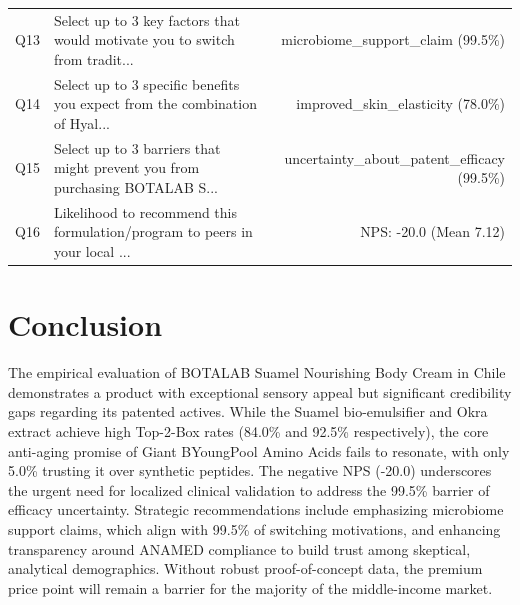 \documentclass[10pt,twocolumn,a4paper]{article}
\begin{document}
\begin{table}[t]
\begin{tabularx}{\textwidth}{l X r}
Q13 & Select up to 3 key factors that would motivate you to switch from tradit... & microbiome\_support\_claim (99.5\%) \\
Q14 & Select up to 3 specific benefits you expect from the combination of Hyal... & improved\_skin\_elasticity (78.0\%) \\
Q15 & Select up to 3 barriers that might prevent you from purchasing BOTALAB S... & uncertainty\_about\_patent\_efficacy (99.5\%) \\
Q16 & Likelihood to recommend this formulation/program to peers in your local ... & NPS: -20.0 (Mean 7.12) \\
\bottomrule
\end{tabularx}
\end{table}

\section{Conclusion}
The empirical evaluation of BOTALAB Suamel Nourishing Body Cream in Chile demonstrates a product with exceptional sensory appeal but significant credibility gaps regarding its patented actives. While the Suamel bio-emulsifier and Okra extract achieve high Top-2-Box rates (84.0\% and 92.5\% respectively), the core anti-aging promise of Giant BYoungPool Amino Acids fails to resonate, with only 5.0\% trusting it over synthetic peptides. The negative NPS (-20.0) underscores the urgent need for localized clinical validation to address the 99.5\% barrier of efficacy uncertainty. Strategic recommendations include emphasizing microbiome support claims, which align with 99.5\% of switching motivations, and enhancing transparency around ANAMED compliance to build trust among skeptical, analytical demographics. Without robust proof-of-concept data, the premium price point will remain a barrier for the majority of the middle-income market.
\end{document}
